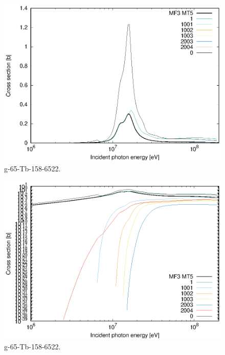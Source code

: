 \begin{figure}
 \includegraphics[width=\linewidth]{eps/g_65-Tb-158_6522.eps}
  \caption{g-65-Tb-158-6522.}
\end{figure}
\begin{figure}
 \includegraphics[width=\linewidth]{eps-log/g_65-Tb-158_6522.eps}
 \caption{g-65-Tb-158-6522.}
\end{figure}
\newpage \clearpage

